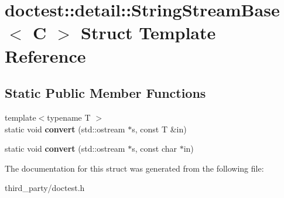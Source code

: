 \hypertarget{structdoctest_1_1detail_1_1_string_stream_base}{}\section{doctest\+::detail\+::String\+Stream\+Base$<$ C $>$ Struct Template Reference}
\label{structdoctest_1_1detail_1_1_string_stream_base}
\subsection*{Static Public Member Functions}
\begin{DoxyCompactItemize}
\item 
\mbox{\label{structdoctest_1_1detail_1_1_string_stream_base_a0eca8e2711f17a565fea3696635a3833}} 
{\footnotesize template$<$typename T $>$ }\\static void {\bfseries convert} (std\+::ostream $\ast$s, const T \&in)
\item 
\mbox{\label{structdoctest_1_1detail_1_1_string_stream_base_a7c248639907b26e46344b91d7ab90be7}} 
static void {\bfseries convert} (std\+::ostream $\ast$s, const char $\ast$in)
\end{DoxyCompactItemize}


The documentation for this struct was generated from the following file\+:\begin{DoxyCompactItemize}
\item 
third\+\_\+party/doctest.\+h\end{DoxyCompactItemize}
